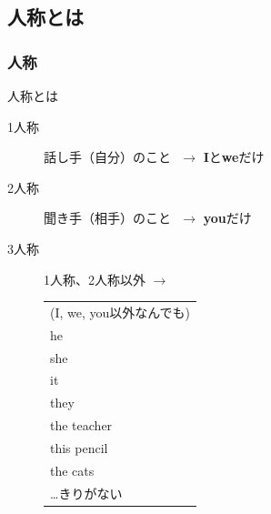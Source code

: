 \documentclass[aspectratio=169,xcolor={dvipsnames,table}]{beamer}
\begin{document}
\subsection{人称とは}
\begin{frame}[plain,label=ninsyo]\frametitle{人称}

\begin{block}{人称とは}
\begin{description}
\item[1人称] 話し手（自分）のこと\pause{}\,\,{} $\longrightarrow$ \textbf{I}と\textbf{we}だけ\pause
\item[2人称] 聞き手（相手）のこと\pause{}\,\,{} $\longrightarrow$ \textbf{you}だけ\pause
\item[3人称] 1人称、2人称以外\pause{}\hspace{15pt} $\longrightarrow$%
 \begin{tabular}[t]{@{\,\,}l}
(I, we, you以外なんでも)\\\pause
he\\\pause
she\\\pause
it\\\pause
they\\\pause
the teacher\\\pause
this pencil\\\pause
the cats\\\pause
\ldots\hfill{}きりがない
 \end{tabular}
\end{description}
\end{block}
\end{frame}
\end{document}
